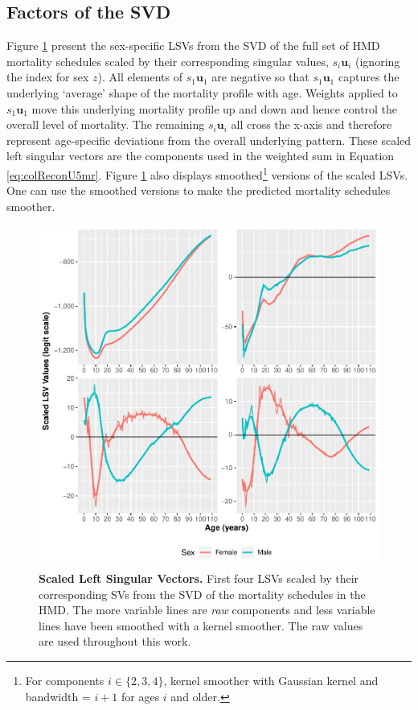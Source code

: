 \documentclass[11pt]{article}
\newcommand{\mbf}{\mathbf}
\DeclareRobustCommand{\LTtot}{}
\begin{document}
\subsection{Factors of the SVD \label{sec:results:SVDFacs}}

Figure \ref{fig:svd}  present the sex-specific LSVs from the SVD of the full set of HMD mortality schedules scaled by their corresponding singular values, $s_{i} \mathbf{u}_{i}$ (ignoring the index for sex $z$).  All elements of $s_1\mbf{u}_1$ are negative so that $s_1\mbf{u}_1$ captures the underlying `average' shape of the mortality profile with age.  Weights applied to $s_1\mbf{u}_1$ move this underlying mortality profile up and down and hence control the overall level of mortality.  The remaining $s_i\mbf{u}_i$ all cross the x-axis and therefore represent age-specific deviations from the overall underlying pattern.  These scaled left singular vectors are the components used in the weighted sum in Equation \ref{eq:colReconU5mr}.  Figure \ref{fig:svd} also displays smoothed\footnote{For components $i \in \{2,3,4\}$, kernel smoother with Gaussian kernel and bandwidth = $i+1$ for ages $i$ and older.} versions of the scaled LSVs.  One can use the smoothed versions to make the predicted mortality schedules smoother.

\begin{figure}[htbp]
   \centering
   \includegraphics[width=\linewidth]{../figures/fig2.pdf} 
   \captionsetup{format=plain,font=normalsize,margin=0cm,justification=justified}
   \caption{\textbf{Scaled Left Singular Vectors.} First four LSVs scaled by their corresponding SVs from the SVD of the \LTtot mortality schedules in the HMD.  The more variable lines are \textit{raw} components and less variable lines have been smoothed with a kernel smoother.  The raw values are used throughout this work.}
   \label{fig:svd}
\end{figure}
\end{document}
